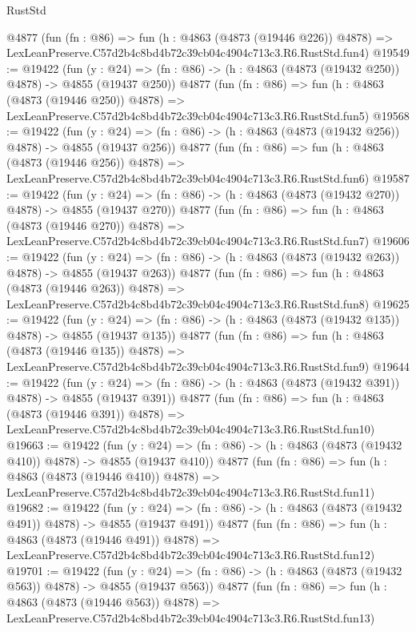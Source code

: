 \begin{lexlean}{RustStd}
\begin{coremodule}
    @4877
    (fun (fn : @86) =>
    fun (h : @4863 (@4873 (@19446 @226)) @4878) =>
    LexLeanPreserve.C57d2b4c8bd4b72c39cb04c4904c713c3.R6.RustStd.fun4)
@19549 := @19422
    (fun (y : @24) => (fn : @86) -> (h : @4863 (@4873 (@19432 @250)) @4878) -> @4855 (@19437 @250))
    @4877
    (fun (fn : @86) =>
    fun (h : @4863 (@4873 (@19446 @250)) @4878) =>
    LexLeanPreserve.C57d2b4c8bd4b72c39cb04c4904c713c3.R6.RustStd.fun5)
@19568 := @19422
    (fun (y : @24) => (fn : @86) -> (h : @4863 (@4873 (@19432 @256)) @4878) -> @4855 (@19437 @256))
    @4877
    (fun (fn : @86) =>
    fun (h : @4863 (@4873 (@19446 @256)) @4878) =>
    LexLeanPreserve.C57d2b4c8bd4b72c39cb04c4904c713c3.R6.RustStd.fun6)
@19587 := @19422
    (fun (y : @24) => (fn : @86) -> (h : @4863 (@4873 (@19432 @270)) @4878) -> @4855 (@19437 @270))
    @4877
    (fun (fn : @86) =>
    fun (h : @4863 (@4873 (@19446 @270)) @4878) =>
    LexLeanPreserve.C57d2b4c8bd4b72c39cb04c4904c713c3.R6.RustStd.fun7)
@19606 := @19422
    (fun (y : @24) => (fn : @86) -> (h : @4863 (@4873 (@19432 @263)) @4878) -> @4855 (@19437 @263))
    @4877
    (fun (fn : @86) =>
    fun (h : @4863 (@4873 (@19446 @263)) @4878) =>
    LexLeanPreserve.C57d2b4c8bd4b72c39cb04c4904c713c3.R6.RustStd.fun8)
@19625 := @19422
    (fun (y : @24) => (fn : @86) -> (h : @4863 (@4873 (@19432 @135)) @4878) -> @4855 (@19437 @135))
    @4877
    (fun (fn : @86) =>
    fun (h : @4863 (@4873 (@19446 @135)) @4878) =>
    LexLeanPreserve.C57d2b4c8bd4b72c39cb04c4904c713c3.R6.RustStd.fun9)
@19644 := @19422
    (fun (y : @24) => (fn : @86) -> (h : @4863 (@4873 (@19432 @391)) @4878) -> @4855 (@19437 @391))
    @4877
    (fun (fn : @86) =>
    fun (h : @4863 (@4873 (@19446 @391)) @4878) =>
    LexLeanPreserve.C57d2b4c8bd4b72c39cb04c4904c713c3.R6.RustStd.fun10)
@19663 := @19422
    (fun (y : @24) => (fn : @86) -> (h : @4863 (@4873 (@19432 @410)) @4878) -> @4855 (@19437 @410))
    @4877
    (fun (fn : @86) =>
    fun (h : @4863 (@4873 (@19446 @410)) @4878) =>
    LexLeanPreserve.C57d2b4c8bd4b72c39cb04c4904c713c3.R6.RustStd.fun11)
@19682 := @19422
    (fun (y : @24) => (fn : @86) -> (h : @4863 (@4873 (@19432 @491)) @4878) -> @4855 (@19437 @491))
    @4877
    (fun (fn : @86) =>
    fun (h : @4863 (@4873 (@19446 @491)) @4878) =>
    LexLeanPreserve.C57d2b4c8bd4b72c39cb04c4904c713c3.R6.RustStd.fun12)
@19701 := @19422
    (fun (y : @24) => (fn : @86) -> (h : @4863 (@4873 (@19432 @563)) @4878) -> @4855 (@19437 @563))
    @4877
    (fun (fn : @86) =>
    fun (h : @4863 (@4873 (@19446 @563)) @4878) =>
    LexLeanPreserve.C57d2b4c8bd4b72c39cb04c4904c713c3.R6.RustStd.fun13)

\end{coremodule}
\end{lexlean}
